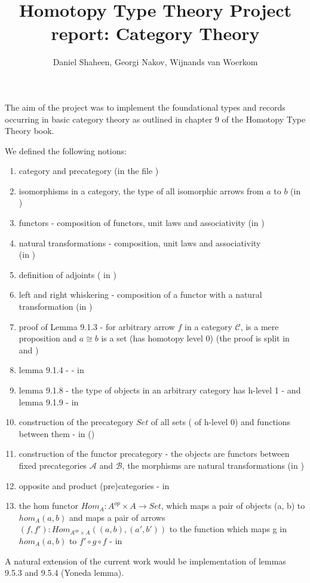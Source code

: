 \documentclass[12pt,a4paper]{article}
\title{Homotopy Type Theory Project report: Category Theory}
\author{Daniel Shaheen, Georgi Nakov, Wijnands van Woerkom}
\date{}
\begin{document}
\maketitle
The aim of the project was to implement the foundational types and records occurring in basic category theory as outlined in chapter 9 of the Homotopy Type Theory book.

We defined the following notions:
\begin{enumerate}[nosep]
  \item category and precategory (in the file )
  \item isomorphisms in a category, the type  of all isomorphic arrows from $a$ to $b$ (in )
  \item functors - composition of functors, unit laws and associativity (in )
  \item natural transformations - composition, unit laws and associativity \\(in )
  \item definition of adjoints ( in )
  \item left and right whiskering - composition of a functor with a natural transformation (in )
  \item proof of Lemma 9.1.3 - for arbitrary arrow $f$ in a category $\mathcal{C}$,  is a mere proposition and $a \cong b$ is a set (has homotopy level 0) (the proof is split in  and )
  \item lemma 9.1.4 -  - in 
  \item lemma 9.1.8 - the type of objects in an arbitrary category has h-level 1 - and lemma 9.1.9 - in  
  \item construction of the precategory $\mathit{Set}$ of all sets ( of h-level 0) and functions between them - in ()
  \item construction of the functor precategory - the objects are functors between fixed precategories $\mathcal{A}$ and $\mathcal{B}$, the morphisms are natural transformations (in )
  \item opposite and product (pre)categories - in 
  \item the hom functor $Hom_A : A^{op} \times A \rightarrow Set$, which maps a pair of objects (a, b) to $hom_A(a, b)$ and maps a pair of arrows $(f , f') : Hom_{A^{op} \times A} ((a, b), (a', b'))$ to the function which maps g in $hom_A(a, b)$ to $f' \circ g \circ f$ - in 
\end{enumerate}
A natural extension of the current work would be implementation of lemmas 9.5.3 and 9.5.4 (Yoneda lemma).
\end{document}
